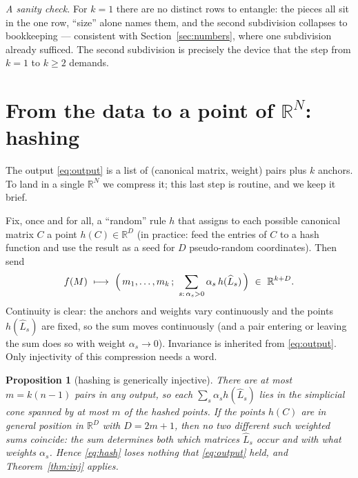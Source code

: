 \documentclass[11pt,a4paper]{article}
\theoremstyle{definition}
\theoremstyle{plain}
\newtheorem{proposition}[definition]{Proposition}
\newcommand{\R}{\mathbb{R}}
\newcommand{\bary}{\widehat}      %
\begin{document}
\emph{A sanity check.} For $k=1$ there are no distinct rows to entangle: the
pieces all sit in the one row, ``size'' alone names them, and the second
subdivision collapses to bookkeeping --- consistent with
Section~\ref{sec:numbers}, where one subdivision already sufficed. The second
subdivision is precisely the device that the step from $k=1$ to $k\ge2$ demands.

\section{From the data to a point of $\R^N$: hashing}
\label{sec:hash}

The output \eqref{eq:output} is a list of (canonical matrix, weight) pairs plus
$k$ anchors. To land in a single $\R^N$ we compress it; this last step is
routine, and we keep it brief.

Fix, once and for all, a ``random'' rule $h$ that assigns to each possible
canonical matrix $C$ a point $h(C)\in\R^{D}$ (in practice: feed the entries of
$C$ to a hash function and use the result as a seed for $D$ pseudo-random
coordinates). Then send
\begin{equation}\label{eq:hash}
   f(M)\ \longmapsto\
   \Bigl(\,m_1,\dots,m_k\,;\ \sum_{s:\,\alpha_s>0}\alpha_s\,h(\bary L_s)\,\Bigr)
   \ \in\ \R^{k+D}.
\end{equation}
Continuity is clear: the anchors and weights vary continuously and the points
$h(\bary L_s)$ are fixed, so the sum moves continuously (and a pair entering or
leaving the sum does so with weight $\alpha_s\to0$). Invariance is inherited from
\eqref{eq:output}. Only injectivity of this compression needs a word.

\begin{proposition}[hashing is generically injective]\label{prop:hash}
There are at most $m=k(n-1)$ pairs in any output, so each $\sum_s\alpha_s
h(\bary L_s)$ lies in the simplicial cone spanned by at most $m$ of the hashed
points. If
the points $h(C)$ are in general position in $\R^{D}$ with $D=2m+1$, then no two
\emph{different} such weighted sums coincide: the sum determines both which
matrices $\bary L_s$ occur and with what weights $\alpha_s$. Hence
\eqref{eq:hash} loses nothing that \eqref{eq:output} held, and
Theorem~\ref{thm:inj} applies.
\end{proposition}
\end{document}
